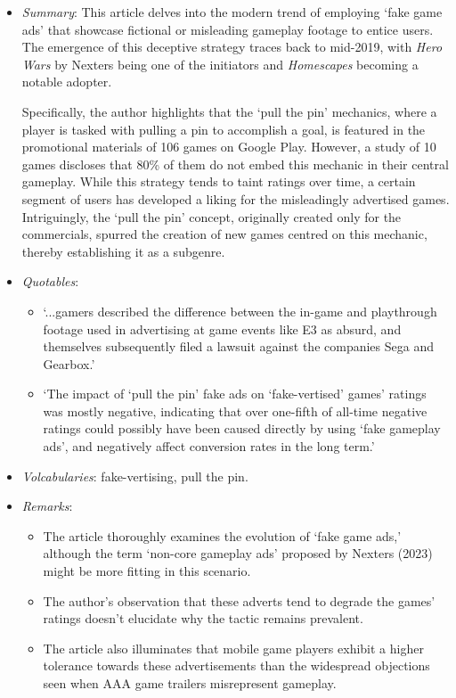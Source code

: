 \documentclass[a4paper, 12pt, mla]{homework}
\begin{document}
\begin{abibliography}
	\begin{itemize}
		\item \textit{Summary}:
			This article delves into the modern trend of employing `fake game ads' that showcase fictional or misleading gameplay footage to entice users. 
			The emergence of this deceptive strategy traces back to mid-2019, with \textit{Hero Wars} by Nexters being one of the initiators and \textit{Homescapes} becoming a notable adopter.
			
			Specifically, the author highlights that the `pull the pin' mechanics, where a player is tasked with pulling a pin to accomplish a goal, is featured in the promotional materials of 106 games on Google Play. 
			However, a study of 10 games discloses that 80\% of them do not embed this mechanic in their central gameplay. 
			While this strategy tends to taint ratings over time, a certain segment of users has developed a liking for the misleadingly advertised games. 
			Intriguingly, the `pull the pin' concept, originally created only for the commercials, spurred the creation of new games centred on this mechanic, thereby establishing it as a subgenre.
		\item \textit{Quotables}:
			\begin{itemize}
				\item `...gamers described the difference between the in-game and playthrough footage used in advertising at game events like E3 as absurd, and themselves subsequently filed a lawsuit against the companies Sega and Gearbox.'
				\item `The impact of `pull the pin' fake ads on `fake-vertised' games' ratings was mostly negative, indicating that over one-fifth of all-time negative ratings could possibly have been caused directly by using `fake gameplay ads', and negatively affect conversion rates in the long term.'
			\end{itemize}
		\item \textit{Volcabularies}: fake-vertising, pull the pin.
		\item \textit{Remarks}:
			\begin{itemize}
				\item The article thoroughly examines the evolution of `fake game ads,' although the term `non-core gameplay ads' proposed by Nexters (2023) might be more fitting in this scenario.
				\item The author's observation that these adverts tend to degrade the games' ratings doesn't elucidate why the tactic remains prevalent.
				\item The article also illuminates that mobile game players exhibit a higher tolerance towards these advertisements than the widespread objections seen when AAA game trailers misrepresent gameplay.
			\end{itemize}
	\end{itemize}



\end{abibliography}
\end{document}

